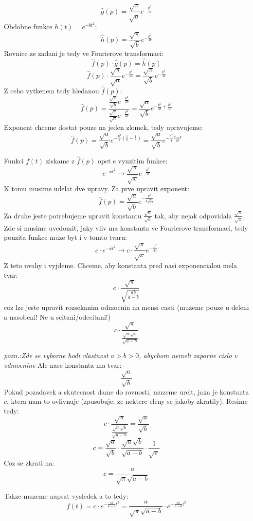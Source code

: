 $$\hat{g}(p)= \frac{\sqrt{\pi}}{\sqrt{a}}e^{-\frac{p^2}{4a}}$$
Obdobne funkce $h(t) = e^{-bt^2}$:
$$\hat{h}(p)= \frac{\sqrt{\pi}}{\sqrt{b}}e^{-\frac{p^2}{4b}}$$
Rovnice ze zadani je tedy ve Fourierove transformaci:
$$\hat{f}(p)\cdot \hat{g}(p) = \hat{h}(p)$$
$$\hat{f}(p) \cdot \frac{\sqrt{\pi}}{\sqrt{a}}e^{-\frac{p^2}{4a}} = \frac{\sqrt{\pi}}{\sqrt{b}}e^{-\frac{p^2}{4b}}$$
Z ceho vytkenem tedy hledanou $\hat{f}(p)$:
$$\hat{f}(p) = \frac{\frac{\sqrt{\pi}}{\sqrt{b}}e^{-\frac{p^2}{4b}}}{\frac{\sqrt{\pi}}{\sqrt{a}}e^{-\frac{p^2}{4a}}}= \frac{\sqrt{a}}{\sqrt{b}}e^{-\frac{p^2}{4b}+\frac{p^2}{4a}}$$
Exponent chceme dostat pouze na jeden zlomek, tedy upravujeme:
$$\hat{f}(p)=\frac{\sqrt{a}}{\sqrt{b}}e^{-\frac{p^2}{4}\left( \frac{1}{b}-\frac{1}{a}\right)} =\frac{\sqrt{a}}{\sqrt{b}}e^{-\frac{p^2}{4} \frac{a-b}{ab}}$$

Funkci $f(t)$ ziskame z $\hat{f}(p)$ opet s vyuzitim funkce:
$$e^{-xt^2} \to \frac{\sqrt{\pi}}{\sqrt{x}}e^{-\frac{p^2}{4x}}$$
K tomu musime udelat dve upravy. Za prve upravit exponent:
$$\hat{f}(p)=\frac{\sqrt{a}}{\sqrt{b}}e^{-\frac{p^2}{4\frac{ab}{a-b}} }$$
Za druhe jeste potrebujeme upravit konstantu $\frac{\sqrt{a}}{\sqrt{b}}$ tak, aby nejak odpovidala $\frac{\sqrt{\pi}}{\sqrt{x}}$. Zde si musime uvedomit, jaky vliv ma konstanta ve Fourierove transformaci, tedy pouzita funkce muze byt i v tomto tvaru:
$$c\cdot e^{-xt^2} \to c\cdot \frac{\sqrt{\pi}}{\sqrt{x}}e^{-\frac{p^2}{4x}}$$
Z teto uvahy i vyjdeme. Chceme, aby konstanta pred nasi exponencialou mela tvar:
$$c\cdot \frac{\sqrt{\pi}}{\sqrt{\frac{ab}{a-b}}}$$
coz lze jeste upravit rozsekanim odmocnin na mensi casti (muzeme pouze u deleni a nasobeni! Ne u scitani/odecitani!)
$$c\cdot \frac{\sqrt{\pi}}{\frac{\sqrt{a} \sqrt{b}}{\sqrt{a-b}}}$$

\textit{pozn.:Zde se vyborne hodi vlastnost $a>b>0$, abychom nemeli zaporne cislo v odmocnine}
Ale nase konstanta ma tvar:
$$\frac{\sqrt{a}}{\sqrt{b}}$$
Pokud pozadavek a skutecnost dame do rovnosti, muzeme urcit, jaka je konstanta $c$, ktera nam to ovlivnuje (zpusobuje, ze nektere cleny se jakoby zkratily). Resime tedy:
$$c\cdot \frac{\sqrt{\pi}}{\frac{\sqrt{a} \sqrt{b}}{\sqrt{a-b}}}=\frac{\sqrt{a}}{\sqrt{b}}$$
$$c = \frac{\sqrt{a}}{\sqrt{b}} \cdot \frac{\sqrt{a} \sqrt{b}}{\sqrt{a-b}}\cdot \frac{1}{\sqrt{\pi}}$$
Coz se zkrati na:
$$c = \frac{a}{\sqrt{\pi}\sqrt{a-b}}$$

Takze muzeme napsat vysledek a to tedy:
$$f(t) =c\cdot e^{-\frac{ab}{a-b} t^2} = \frac{a}{\sqrt{\pi}\sqrt{a-b}} \cdot e^{-\frac{ab}{a-b} t^2} $$


